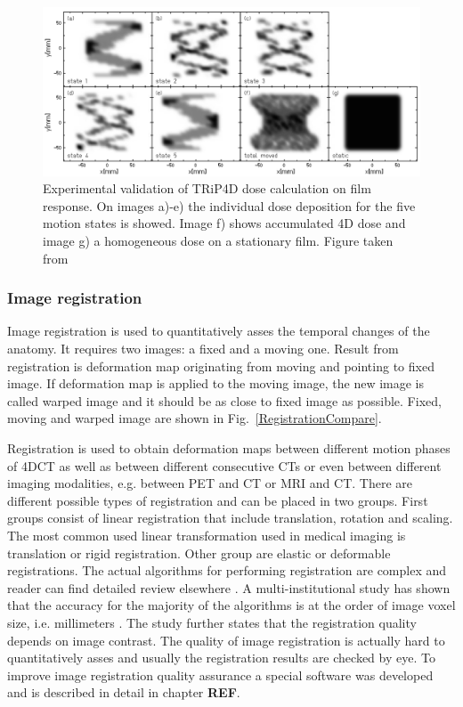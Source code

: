\documentclass[type=dr, dr=rernat, accentcolor=tud7b,colorbacktitle, bigchapter, openright, twoside, 12pt ]{tudthesis}
\begin{document}
\begin{figure}[H]
\begin{center}
\includegraphics[scale=0.35]{./Images/4DtreatmentPlanning.png}
\caption{Experimental validation of TRiP4D dose calculation on film response. On images a)-e) the individual dose deposition for the five motion states is showed.
Image f) shows accumulated 4D dose and image g) a homogeneous dose on a stationary film. Figure taken from \cite{Richter2012}}
\label{TRiP4Ddose}
\end{center}
\end{figure}

\subsubsection{Image registration}
\label{sec:registration}

Image registration is used to quantitatively asses the temporal changes of the anatomy. It requires two images: a fixed and a moving one. Result from registration is deformation map originating from moving and pointing to fixed image. If deformation map is applied to the moving image, the new image is called warped image and it should be as close to fixed image as possible. Fixed, moving and warped image are shown in Fig.~\ref{RegistrationCompare}. 

Registration is used to obtain deformation maps between different motion phases of 4DCT
as well as between different consecutive CTs or even between different imaging modalities, e.g. between PET and CT or MRI and CT. There are different possible types of
registration and can be placed in two groups. First groups consist of linear registration that include translation, rotation and scaling. The most common used linear transformation used
in medical imaging is translation or rigid registration. Other group are elastic or deformable registrations. The actual algorithms for performing registration are complex and reader can
find detailed review elsewhere \cite{Hill2001,Brock2006,Rietzel2006a}. A multi-institutional study has shown that the accuracy for the majority of the algorithms is at the order of image voxel
size, i.e. millimeters \cite{Brock2010}. The study further states that the registration quality depends on image contrast. The quality of image registration is actually hard to quantitatively
asses and usually the registration results are checked by eye. To improve image registration quality assurance a special software was developed and is described in detail in chapter \textbf{REF}.
\end{document}
